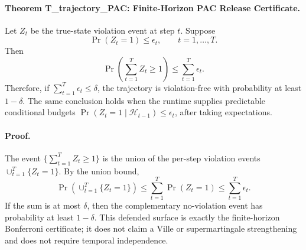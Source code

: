 \paragraph{Theorem T\_trajectory\_PAC: Finite-Horizon PAC Release Certificate.}
Let \(Z_t\) be the true-state violation event at step \(t\). Suppose
\[
  \Pr(Z_t=1)\le \epsilon_t,\qquad t=1,\ldots,T .
\]
Then
\[
  \Pr\left(\sum_{t=1}^{T}Z_t\ge 1\right)
  \le \sum_{t=1}^{T}\epsilon_t .
\]
Therefore, if \(\sum_{t=1}^{T}\epsilon_t\le\delta\), the trajectory is
violation-free with probability at least \(1-\delta\). The same conclusion
holds when the runtime supplies predictable conditional budgets
\(\Pr(Z_t=1\mid\mathcal H_{t-1})\le\epsilon_t\), after taking expectations.

\paragraph{Proof.}
The event \(\{\sum_{t=1}^{T}Z_t\ge 1\}\) is the union of the per-step violation
events \(\cup_{t=1}^{T}\{Z_t=1\}\). By the union bound,
\[
\Pr\left(\cup_{t=1}^{T}\{Z_t=1\}\right)
\le \sum_{t=1}^{T}\Pr(Z_t=1)
\le \sum_{t=1}^{T}\epsilon_t .
\]
If the sum is at most \(\delta\), then the complementary no-violation event has
probability at least \(1-\delta\). This defended surface is exactly the
finite-horizon Bonferroni certificate; it does not claim a Ville or
supermartingale strengthening and does not require temporal independence.
